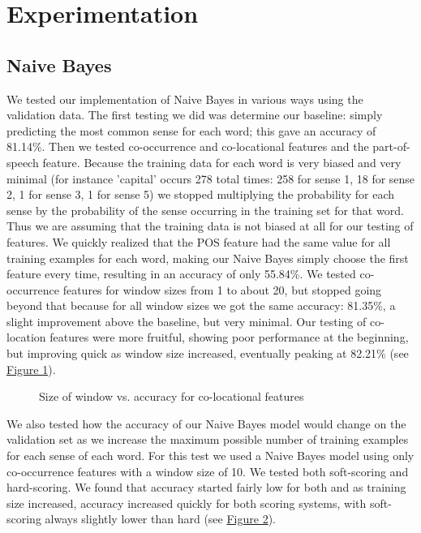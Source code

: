 \documentclass{article}
\begin{document}
\section{Experimentation}

\subsection{Naive Bayes}

We tested our implementation of Naive Bayes in various ways using the validation data. The first testing we did was determine our baseline: simply predicting the most common sense for each word; this gave an accuracy of 81.14\%. Then we tested co-occurrence and co-locational features and the part-of-speech feature. Because the training data for each word is very biased and very minimal (for instance 'capital' occurs 278 total times: 258 for sense 1, 18 for sense 2, 1 for sense 3, 1 for sense 5) we stopped multiplying the probability for each sense by the probability of the sense occurring in the training set for that word. Thus we are assuming that the training data is not biased at all for our testing of features. We quickly realized that the POS feature had the same value for all training examples for each word, making our Naive Bayes simply choose the first feature every time, resulting in an accuracy of only 55.84\%. We tested co-occurrence features for window sizes from 1 to about 20, but stopped going beyond that because for all window sizes we got the same accuracy: 81.35\%, a slight improvement above the baseline, but very minimal. Our testing of co-location features were more fruitful, showing poor performance at the beginning, but improving quick as window size increased, eventually peaking at 82.21\% (see \hyperref[fig:col]{Figure 1}).

\begin{figure}[h]\label{fig:col}
\centering
{}
\caption{Size of window vs. accuracy for co-locational features}
\end{figure}

We also tested how the accuracy of our Naive Bayes model would change on the validation set as we increase the maximum possible number of training examples for each sense of each word. For this test we used a Naive Bayes model using only co-occurrence features with a window size of 10. We tested both soft-scoring and hard-scoring. We found that accuracy started fairly low for both and as training size increased, accuracy increased quickly for both scoring systems, with soft-scoring always slightly lower than hard (see \hyperref[fig:size]{Figure 2}).
\end{document}
